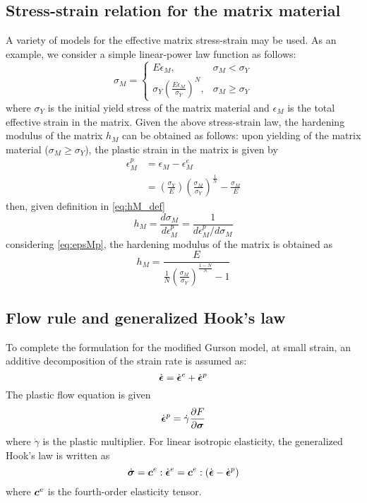 \subsection{Stress-strain relation for the matrix material}
A variety of models for the effective matrix stress-strain may be
used. As an example, we consider a simple linear-power law function as
follows:
\begin{equation}\label{eq:sigM_epsM}
\sigma_M =
	\begin{cases}
	E\epsilon_M,  &\sigma_M < \sigma_Y \\
	\sigma_Y \left( \frac{E\epsilon_M}{\sigma_Y} \right)^N,  & \sigma_M \geq \sigma_Y 
	\end{cases}
\end{equation}
where $\sigma_Y$ is the initial yield stress of the matrix material
and $\epsilon_M$ is the total effective strain in the matrix. Given
the above stress-strain law, the hardening modulus of the matrix $h_M$
can be obtained as follows: upon yielding of the matrix material
($\sigma_M \geq \sigma_Y$), the plastic strain in the matrix is given
by
\begin{equation}\label{eq:epsMp}
	\begin{aligned}
	\epsilon^p_M &= \epsilon_M - \epsilon^e_M \\
					   &=  \left( \frac{\sigma_Y}{E}\right) \left( \frac{\sigma_M}{\sigma_Y} \right) ^{\frac{1}{N}} - \frac{\sigma_M}{E}
	\end{aligned}
\end{equation}
then, given definition in \eqref{eq:hM_def}
\begin{equation}
h_M = \frac{d\sigma_M}{d\epsilon^p_M} = \frac{1}{d\epsilon^p_M / d\sigma_M}
\end{equation}
considering \eqref{eq:epsMp}, the hardening modulus of the matrix is obtained as
\begin{equation}\label{eq:hM}
h_M = \frac{E}{ \frac{1}{N} \left( \frac{\sigma_M}{\sigma_Y} \right)^{\frac{1-N}{N}} - 1}
\end{equation}

\subsection{Flow rule and generalized Hook's law}
To complete the formulation for the modified Gurson model, at small
strain, an additive decomposition of the strain rate is assumed as:
\begin{equation}
  \dot{{\boldsymbol{\epsilon}}} = \dot{{\boldsymbol{\epsilon}}}^e + \dot{{\boldsymbol{\epsilon}}}^p
\end{equation}
The plastic flow equation is given
\begin{equation}\label{eq:flow_rule}
  \dot{{\boldsymbol{\epsilon}}}^p = \dot{\gamma}\frac{\partial F}{\partial{\boldsymbol{\sigma}}}
\end{equation}
where $\dot{\gamma}$ is the plastic multiplier. For linear isotropic
elasticity, the generalized Hook's law is written as
\begin{equation}
  \dot{{\boldsymbol{\sigma}}} = {\boldsymbol{c}}^e : \dot{{\boldsymbol{\epsilon}}}^e = {\boldsymbol{c}}^e : (\dot{{\boldsymbol{\epsilon}}} - \dot{{\boldsymbol{\epsilon}}}^p)
\end{equation}
where ${\boldsymbol{c}}^e$ is the fourth-order elasticity tensor.

